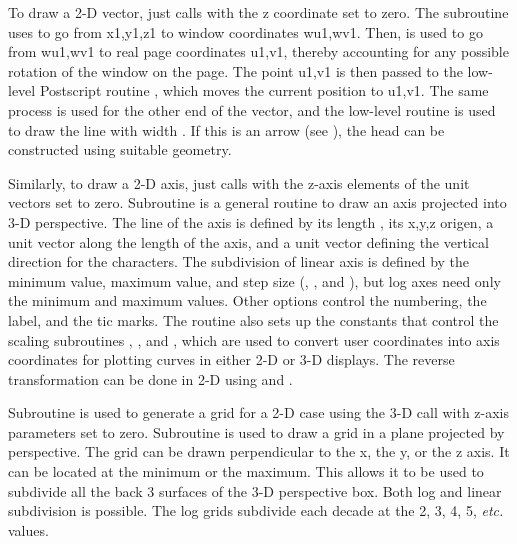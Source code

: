 To draw a 2-D vector, 
just calls  with
the z coordinate set to zero.  The subroutine  uses
 to go from x1,y1,z1 to window coordinates wu1,wv1.
Then,  is used to go from wu1,wv1 to real page
coordinates u1,v1, thereby accounting for any possible rotation of
the window on the page.  The point u1,v1 is then passed to the
low-level Postscript routine , which moves the
current position to u1,v1.  The same process is used for the other
end of the vector, and the low-level routine
 is used
to draw the line with width .  If this is an arrow (see
), the head can be constructed using suitable geometry.

Similarly, to draw a 2-D axis, 
just calls  with the
z-axis elements of the unit vectors set to zero.  Subroutine
 is a general routine to draw an axis projected into 3-D
perspective.  The line of the axis is defined by its length
, its x,y,z origen, a unit vector along the length of
the axis, and a unit vector defining the vertical direction for
the characters.  The subdivision of linear axis is defined by the
minimum value, maximum value, and step size (,
, and ), but log axes need only the minimum
and maximum values.  Other options control the numbering,
the label, and the tic marks.  The  routine also sets
up the constants that control the scaling subroutines
,
, and
, which are used to convert user
coordinates into axis coordinates for plotting curves in either
2-D or 3-D displays.  The reverse transformation can be done in 2-D
using  and .

Subroutine  is used to
generate a grid for a 2-D case using the 3-D call with z-axis
parameters set to zero.  Subroutine
 is used to draw a grid
in a plane projected by perspective.  The grid can be drawn
perpendicular to the x, the y, or the z axis.  It can be located
at the minimum or the maximum.  This allows it to be used
to subdivide all the back 3 surfaces of the 3-D perspective box.
Both log and linear subdivision is possible.  The log grids
subdivide each decade at the 2, 3, 4, 5, {\it etc.} values.

